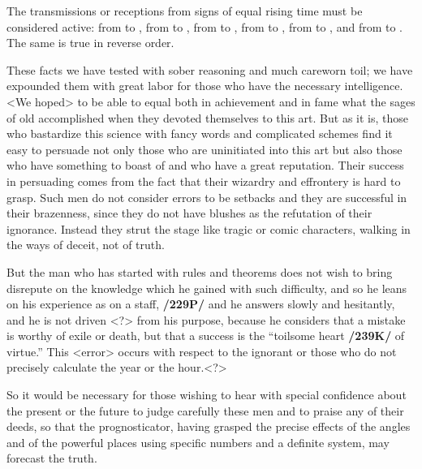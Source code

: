 The transmissions or receptions from signs of equal rising time must be considered active: from \Aries\xspace to \Pisces, from \Taurus\xspace to \Aquarius, from \Gemini\xspace to \Capricorn, from \Cancer\xspace to \Sagittarius, from \Leo\xspace to \Scorpio, and from \Virgo\xspace to \Libra. The same is true in reverse order.

These facts we have tested with sober reasoning and much careworn toil; we have expounded them with great labor for those who have the necessary intelligence. <We hoped> to be able to equal both in
achievement and in fame what the sages of old accomplished when they devoted themselves to this art. But as it is, those who bastardize this science with fancy words and complicated schemes find it easy to
persuade not only those who are uninitiated into this art but also those who have something to boast of and who have a great reputation. Their success in persuading comes from the fact that their wizardry and effrontery is hard to grasp. Such men do not consider errors to be setbacks and they are successful in their brazenness, since they do not have blushes as the refutation of their ignorance. Instead they strut the stage like tragic or comic characters, walking in the ways of deceit, not of truth. 

But the man who has started with rules and theorems does not wish to bring disrepute on the knowledge which he gained with such difficulty, and so he leans on his experience as on a staff, \textbf{/229P/} and he answers slowly and hesitantly, and he is not driven <?> from his purpose, because he considers that a mistake is worthy of exile or death, but that a success is the “toilsome heart \textbf{/239K/} of virtue.” This <error> occurs with respect to the ignorant or those who do not precisely calculate the year or the hour.<?>

So it would be necessary for those wishing to hear with special confidence about the present or the future to judge carefully these men and to praise any of their deeds, so that the prognosticator, having grasped the precise effects of the angles and of the powerful places using specific numbers and a definite system, may forecast the truth.

